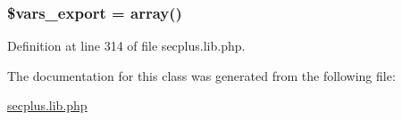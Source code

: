 \hypertarget{class_sec_plus_1_1_abstract_controller_a7ee199b82a5324150f9b8506fa9c6ad7}{
\subsubsection[{\$vars\_\-export}]{\setlength{\rightskip}{0pt plus 5cm}\$vars\_\-export = array()}}
\label{class_sec_plus_1_1_abstract_controller_a7ee199b82a5324150f9b8506fa9c6ad7}


Definition at line 314 of file secplus.lib.php.



The documentation for this class was generated from the following file:\begin{DoxyCompactItemize}
\item 
\hyperlink{secplus_8lib_8php}{secplus.lib.php}\end{DoxyCompactItemize}
